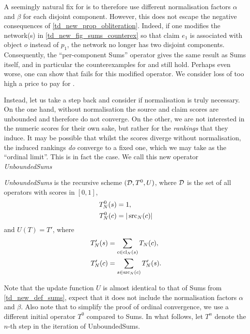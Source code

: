 A seemingly natural fix for \disjointindependence{} is to therefore use
different normalisation factors $\alpha$ and $\beta$ for each disjoint
component. However, this does not escape the negative consequences of
\cref{td_new_prop_obliteration}. Indeed, if one modifies the network(s) in
\cref{td_new_fig_sums_counterex} so that claim $e_1$ is associated with object
$o$ instead of $p_1$, the network no longer has two disjoint components.
Consequently, the ``per-component Sums'' operator gives the same result as Sums
itself, and in particular the counterexamples for \freshposresp{} and
\sourceposresp{} still hold. Perhaps even worse, one can show that
\claimcoherence{} fails for this modified operator. We consider loss of
\claimcoherence{} too high a price to pay for \disjointindependence{}.

Instead, let us take a step back and consider if normalisation is truly
necessary. On the one hand, without normalisation the source and claim scores
are unbounded and therefore do not converge. On the other, we are not
interested in the numeric scores for their own sake, but rather for the
\emph{rankings} that they induce. It may be possible that whilst the scores
diverge without normalisation, the induced rankings \emph{do} converge to a
fixed one, which we may take as the ``ordinal limit''. This is in fact the
case.  We call this new operator \emph{UnboundedSums}

\begin{definition}
    \emph{UnboundedSums} is the recursive scheme $(\mathcal{D}, T^0, U)$, where $\mathcal{D}$ is
    the set of all operators with scores in $[0, 1]$,
    \begin{align*}
        T^0_N(s) &= 1, \\
        T^0_N(c) &= |\operatorname{src}_N(c)|
    \end{align*}
    and $U(T) = T'$, where
    \begin{align*}
        T'_N(s) &=
            \sum_{c \in \operatorname{cl}_N(s)}{
                T_N(c)
            },
        \\
        T'_N(c) &=
            \sum_{s \in \operatorname{src}_N(c)}{
                T'_N(s)
            }.
    \end{align*}
\end{definition}

Note that the update function $U$ is almost identical to that of Sums from
\cref{td_new_def_sums}, expect that it does not include the normalisation
factors $\alpha$ and $\beta$. Also note that to simplify the proof of ordinal
convergence, we use a different initial operator $T^0$ compared to Sums. In
what follows, let $T^n$ denote the $n$-th step in the iteration of
UnboundedSums.

